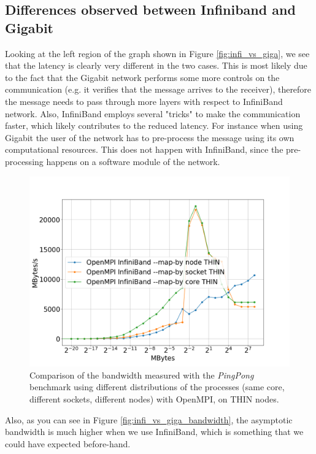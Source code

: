 \documentclass{article}
\begin{document}
\subsection{Differences observed between Infiniband and Gigabit}

Looking at the left region of the graph shown in Figure \ref{fig:infi_vs_giga}, we see that the latency is clearly very different in the two cases. This is most likely due to the fact that the Gigabit network performs some more controls on the communication (e.g. it verifies that the message arrives to the receiver), therefore the message needs to pass through more layers with respect to InfiniBand network. Also, InfiniBand employs several "tricks" to make the communication faster, which likely contributes to the reduced latency. For instance when using Gigabit the user of the network has to pre-process the message using its own computational resources. This does not happen with InfiniBand, since the pre-processing happens on a software module of the network.

\begin{figure}[t!]
    \centering
    \includegraphics[width=\textwidth]{benchmark/mapby_bandwidth.png}
    \caption{Comparison of the bandwidth measured with the \emph{PingPong} benchmark using different distributions of the processes (same core, different sockets, different nodes) with OpenMPI, on THIN nodes.}
    \label{fig:mapby}
\end{figure}

Also, as you can see in Figure \ref{fig:infi_vs_giga_bandwidth}, the asymptotic bandwidth is much higher when we use InfiniBand, which is something that we could have expected before-hand.
\end{document}
